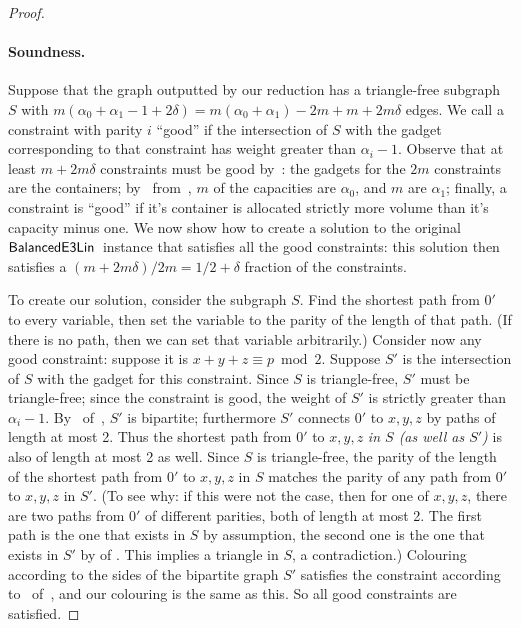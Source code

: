 \documentclass[a4paper,11pt, DIV=11]{scrartcl}
\DeclareMathOperator{\belin}{\textnormal{\textsf{BalancedE3Lin}}}
\theoremstyle{plain}
\theoremstyle{definition}
\begin{document}
\begin{proof}
    \paragraph{Soundness.} Suppose that the graph outputted by our reduction has a triangle-free subgraph $S$ with $m (\alpha_0 + \alpha_1 - 1 + 2\delta) = m(\alpha_0 + \alpha_1) - 2m + m + 2m\delta$ edges. We call a constraint with parity $i$ ``good'' if the intersection of $S$ with the gadget corresponding to that constraint has weight greater than $\alpha_i- 1$. Observe that at least $m + 2m\delta$ constraints must be good by~:  the gadgets for the $2m$ constraints are the containers; by~ from~, $m$ of the capacities are $\alpha_0$, and $m$ are $\alpha_1$; finally, a constraint is ``good'' if it's container is allocated strictly more volume than it's capacity minus one.
    We now show how to create a solution to the original $\belin{}$ instance that satisfies all the good constraints: this solution then satisfies a $(m + 2m \delta) / 2m = 1/2 + \delta$ fraction of the constraints.

    To create our solution, consider the subgraph $S$. Find the shortest path from $0'$ to every variable, then set the variable to the parity of the length of that path. (If there is no path, then we can set that variable arbitrarily.) Consider now any good constraint: suppose it is $x + y + z \equiv p \bmod 2$. Suppose $S'$ is the intersection of $S$ with the gadget for this constraint. Since $S$ is triangle-free, $S'$ must be triangle-free; since the constraint is good, the weight of $S'$ is strictly greater than $\alpha_i - 1$. By~ of~, $S'$ is bipartite; furthermore $S'$ connects $0'$ to $x, y, z$ by paths of length at most 2. Thus the shortest path from $0'$ to $x, y, z$ \emph{in $S$ (as well as $S'$)} is also of length at most 2 as well. Since $S$ is triangle-free, the parity of the length of the shortest path from $0'$ to $x, y, z$ in $S$ matches the parity of any path from $0'$ to $x, y, z$ in $S'$. (To see why: if this were not the case, then for one of $x, y, z$, there are two paths from $0'$ of different parities, both of length at most 2. The first path is the one that exists in $S$ by assumption, the second one is the one that exists in $S'$ by  of . This implies a triangle in $S$, a contradiction.)
    Colouring according to the sides of the bipartite graph $S'$ satisfies the constraint according to~ of~, and our colouring is the same as this. So all good constraints are satisfied.


\end{proof}
\end{document}
